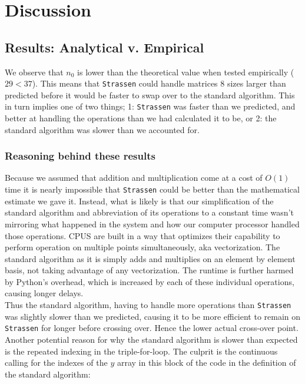 \documentclass[11pt]{scrartcl}
\theoremstyle{dotlessP}
\theoremstyle{dotlessN}
\theoremstyle{dotN}
\begin{document}
\section{Discussion}
\subsection{Results: Analytical v. Empirical}
We observe that $n_0$ is lower than the theoretical value when tested empirically ($29 < 37$). This means that \texttt{Strassen} could handle matrices 8 sizes larger than predicted before it would be faster to swap over to the standard algorithm. This in turn implies one of two things; 1: \texttt{Strassen} was faster than we predicted, and better at handling the operations than we had calculated it to be, or 2: the standard algorithm was slower than we accounted for. \\

\subsubsection{Reasoning behind these results}

Because we assumed that addition and multiplication come at a cost of $O(1)$ time it is nearly impossible that \texttt{Strassen} could be better than the mathematical estimate we gave it. Instead, what is likely is that our simplification of the standard algorithm and abbreviation of its operations to a constant time wasn't mirroring what happened in the system and how our computer processor handled those operations. CPUS are built in a way that optimizes their capability to perform operation on multiple points simultaneously, aka vectorization. The standard algorithm as it is simply adds and multiplies on an element by element basis, not taking advantage of any vectorization. The runtime is further harmed by Python's overhead, which is increased by each of these individual operations, causing longer delays.\\

Thus the standard algorithm, having to handle more operations than \texttt{Strassen} was slightly slower than we predicted, causing it to be more efficient to remain on \texttt{Strassen} for longer before crossing over. Hence the lower actual cross-over point. \\

Another potential reason for why the standard algorithm is slower than expected is the repeated indexing in the triple-for-loop. The culprit is the continuous calling for the indexes of the $y$ array in this block of the code in the definition of the standard algorithm:
\end{document}
